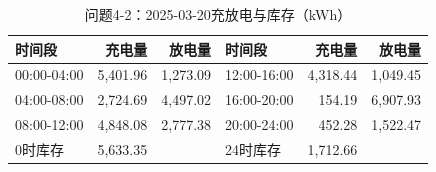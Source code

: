 \begin{table}[H]\centering\small\caption{问题4-2：2025-03-20充放电与库存（kWh）}\label{tab:q4_220250320b}
\begin{tabular}{lrrlrr}\toprule
时间段 & 充电量 & 放电量 & 时间段 & 充电量 & 放电量\\\midrule
00:00-04:00 & 5,401.96 & 1,273.09 & 12:00-16:00 & 4,318.44 & 1,049.45\\
04:00-08:00 & 2,724.69 & 4,497.02 & 16:00-20:00 & 154.19 & 6,907.93\\
08:00-12:00 & 4,848.08 & 2,777.38 & 20:00-24:00 & 452.28 & 1,522.47\\
0时库存 & 5,633.35 &  & 24时库存 & 1,712.66 & \\
\bottomrule\end{tabular}\end{table}
